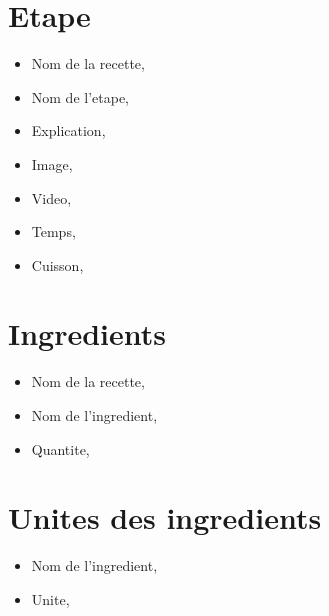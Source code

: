 \documentclass[a4paper,10pt]{report}
\begin{document}
\section{Etape}

\begin{itemize}
	\item Nom de la recette,
	\item Nom de l'etape,
	\item Explication,
	\item Image,
	\item Video,
	\item Temps,
	\item Cuisson,
\end{itemize}

\section{Ingredients}

\begin{itemize}
	\item Nom de la recette,
	\item Nom de l'ingredient,
	\item Quantite,
\end{itemize}

\section{Unites des ingredients}

\begin{itemize}
	\item Nom de l'ingredient,
	\item Unite,
\end{itemize}
\end{document}

